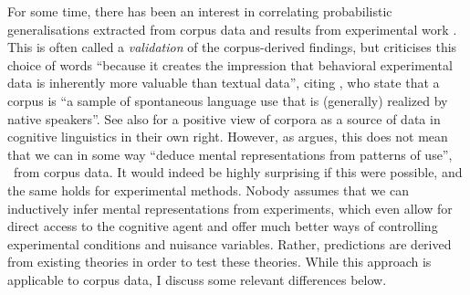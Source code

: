 For some time, there has been an interest in correlating probabilistic generalisations extracted from corpus data and results from experimental work \citep{ArppeJaervikivi2007,BresnanEa2007,BresnanFord2010,DivjakGries2008,DivjakEa2016,FordBresnan2013}.
This is often called a \textit{validation} of the corpus-derived findings, but \citet[303]{Divjak2016a} criticises this choice of words ``because it creates the impression that behavioral experimental data is inherently more valuable than textual data'', citing \citet{TummersEa2005}, who state that a corpus is ``a sample of spontaneous language use that is (generally) realized by native speakers''.
See also \citet{Newman2011} for a positive view of corpora as a source of data in cognitive linguistics in their own right.
However, as \citet[486--487]{Dabrowska2016} argues, this does not mean that we can in some way ``deduce mental representations from patterns of use'', \ie\ from corpus data.
It would indeed be highly surprising if this were possible, and the same holds for experimental methods.
Nobody assumes that we can inductively infer mental representations from experiments, which even allow for direct access to the cognitive agent and offer much better ways of controlling experimental conditions and nuisance variables.
Rather, predictions are derived from existing theories in order to test these theories.
While this approach is applicable to corpus data, I discuss some relevant differences below.

